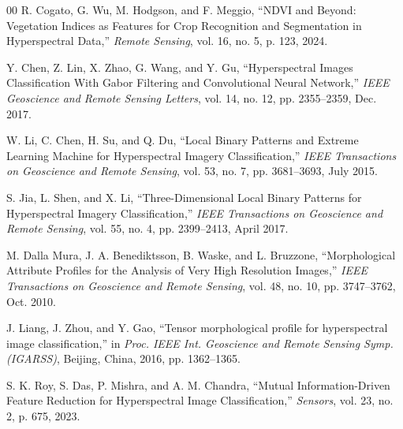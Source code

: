 \documentclass[conference]{IEEEtran}
\begin{document}
\begin{thebibliography}{00}
 R. Cogato, G. Wu, M. Hodgson, and F. Meggio, ``NDVI and Beyond: Vegetation Indices as Features for Crop Recognition and Segmentation in Hyperspectral Data,'' \textit{Remote Sensing}, vol. 16, no. 5, p. 123, 2024.

 Y. Chen, Z. Lin, X. Zhao, G. Wang, and Y. Gu, ``Hyperspectral Images Classification With Gabor Filtering and Convolutional Neural Network,'' \textit{IEEE Geoscience and Remote Sensing Letters}, vol. 14, no. 12, pp. 2355--2359, Dec. 2017.

 W. Li, C. Chen, H. Su, and Q. Du, ``Local Binary Patterns and Extreme Learning Machine for Hyperspectral Imagery Classification,'' \textit{IEEE Transactions on Geoscience and Remote Sensing}, vol. 53, no. 7, pp. 3681--3693, July 2015.

 S. Jia, L. Shen, and X. Li, ``Three-Dimensional Local Binary Patterns for Hyperspectral Imagery Classification,'' \textit{IEEE Transactions on Geoscience and Remote Sensing}, vol. 55, no. 4, pp. 2399--2413, April 2017.

 M. Dalla Mura, J. A. Benediktsson, B. Waske, and L. Bruzzone, ``Morphological Attribute Profiles for the Analysis of Very High Resolution Images,'' \textit{IEEE Transactions on Geoscience and Remote Sensing}, vol. 48, no. 10, pp. 3747--3762, Oct. 2010.

 J. Liang, J. Zhou, and Y. Gao, ``Tensor morphological profile for hyperspectral image classification,'' in \textit{Proc. IEEE Int. Geoscience and Remote Sensing Symp. (IGARSS)}, Beijing, China, 2016, pp. 1362--1365.

 S. K. Roy, S. Das, P. Mishra, and A. M. Chandra, ``Mutual Information-Driven Feature Reduction for Hyperspectral Image Classification,'' \textit{Sensors}, vol. 23, no. 2, p. 675, 2023.

\end{thebibliography}
\end{document}
